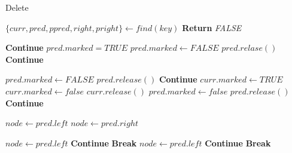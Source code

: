 \documentclass{article}
\begin{document}
\begin{algorithm}
\caption{Delete}
\begin{algorithmic}[1]
        \State $\{curr, pred, ppred, right, pright\} \gets find(key)$
            \State \textbf{Return} \textit{FALSE}
        \EndIf
        
        \State {}
         
            \State \textbf{Continue}
        \Else
            \State $pred.marked = \textit{TRUE}$
                \State $pred.marked \gets \textit{FALSE}$
                \State $pred.relase()$
                \State \textbf{Continue}
            \EndIf
               
             
                \State $pred.marked \gets \textit{FALSE}$
                \State $pred.release()$
                \State \textbf{Continue}
            \Else
                \State $curr.marked \gets \textit{TRUE}$
                    \State $curr.marked \gets false$
                    \State $curr.release()$
                    \State $pred.marked \gets false$
                    \State $pred.release()$
                    \State \textbf{Continue}
                \EndIf
                
                    \State $node \gets pred.left$
                \Else
                    \State $node \gets pred.right$
                \EndIf
                
                            \State $node \gets pred.left$
                            \State \textbf{Continue}
                        \EndIf
                        \State \textbf{Break}
                    \Else
                            \State $node \gets pred.left$
                            \State \textbf{Continue}
                        \EndIf
                        \State \textbf{Break}
                    \EndIf
                \EndWhile
            \EndIf
        \EndIf
\end{algorithmic}
\end{algorithm}
\end{document}
